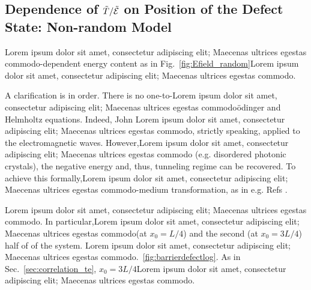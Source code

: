 \subsection{Dependence of \texorpdfstring{$\tilde{T}/\tilde{\cal E}$}{T/E} on Position of the Defect State: Non-random Model}
\label{app:qm_model}

Lorem ipsum dolor sit amet, consectetur adipiscing elit; Maecenas ultrices egestas commodo-dependent energy content as in Fig.~\ref{fig:Efield_random}Lorem ipsum dolor sit amet, consectetur adipiscing elit; Maecenas ultrices egestas commodo. 

A clarification is in order. There is no one-to-Lorem ipsum dolor sit amet, consectetur adipiscing elit; Maecenas ultrices egestas commodo\"{o}dinger and Helmholtz equations\cite{2004_dragoman_book}. Indeed, John \cite{1991_John}Lorem ipsum dolor sit amet, consectetur adipiscing elit; Maecenas ultrices egestas commodo, strictly speaking, applied to the electromagnetic waves. However,Lorem ipsum dolor sit amet, consectetur adipiscing elit; Maecenas ultrices egestas commodo\cite{1987_John} (e.g. disordered photonic crystals), the negative energy and, thus, tunneling regime can be recovered. To achieve this formally,Lorem ipsum dolor sit amet, consectetur adipiscing elit; Maecenas ultrices egestas commodo-medium transformation, as in e.g. Refs \cite{1994_Sipe,2004_Bliokh_wavelet,2008_Yamilov_JoSAB}. 

Lorem ipsum dolor sit amet, consectetur adipiscing elit; Maecenas ultrices egestas commodo. In particular,Lorem ipsum dolor sit amet, consectetur adipiscing elit; Maecenas ultrices egestas commodo(at $x_0=L/4$) and the second (at $x_0=3L/4$) half of of the system. Lorem ipsum dolor sit amet, consectetur adipiscing elit; Maecenas ultrices egestas commodo.~\ref{fig:barrierdefectlog}. As in Sec.~\ref{sec:correlation_te}, $x_0=3L/4$Lorem ipsum dolor sit amet, consectetur adipiscing elit; Maecenas ultrices egestas commodo.

